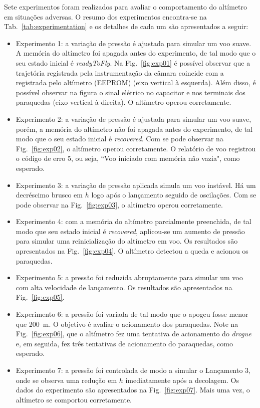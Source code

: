 \documentclass[12pt,a4paper]{article}
\begin{document}
Sete experimentos foram realizados para avaliar o comportamento do altímetro em situações adversas. O resumo dos experimentos encontra-se na Tab.~\ref{tab:experimentation} e os detalhes de cada um são apresentados a seguir:
\begin{itemize}
\item Experimento 1: a variação de pressão é ajustada para simular um voo suave. A memória do altímetro foi apagada antes do experimento, de tal modo que o seu estado inicial é \textit{readyToFly}. Na Fig.~\ref{fig:exp01} é possível observar que a trajetória registrada pela instrumentação da câmara coincide com a registrada pelo altímetro (EEPROM) (eixo vertical à esquerda). Além disso, é possível observar na figura o sinal elétrico no capacitor e nos terminais dos paraquedas (eixo vertical à direita). O altímetro operou corretamente.
\item Experimento 2: a variação de pressão é ajustada para simular um voo suave, porém, a memória do altímetro não foi apagada antes do experimento, de tal modo que o seu estado inicial é \textit{recovered}. Com se pode observar na Fig.~\ref{fig:exp02}, o altímetro operou corretamente. O relatório de voo registrou o código de erro 5, ou seja, ``Voo iniciado com memória não vazia", como esperado.
\item Experimento 3: a variação de pressão aplicada simula um voo instável. Há um decréscimo brusco em $h$ logo após o lançamento seguido de oscilações. Com se pode observar na Fig.~\ref{fig:exp03}, o altímetro operou corretamente.
\item Experimento 4: com a memória do altímetro parcialmente preenchida, de tal modo que seu estado inicial é \textit{recovered}, aplicou-se um aumento de pressão para simular uma reinicialização do altímetro em voo. Os resultados são apresentados na Fig.~\ref{fig:exp04}.  O altímetro detectou a queda e acionou os paraquedas.
\item Experimento 5: a pressão foi reduzida abruptamente para simular um voo com alta velocidade de lançamento. Os resultados são apresentados na Fig.~\ref{fig:exp05}. 
\item Experimento 6: a pressão foi variada de tal modo que o apogeu fosse menor que 200~m. O objetivo é avaliar o acionamento dos paraquedas. Note na Fig.~\ref{fig:exp06}, que o altímetro fez uma tentativa de acionamento do \textit{drogue} e, em seguida, fez três tentativas de acionamento do paraquedas, como esperado.
\item Experimento 7: a pressão foi controlada de modo a simular o Lançamento 3, onde se observa uma redução em $h$ imediatamente após a decolagem. Os dados do experimento são apresentados na Fig.~\ref{fig:exp07}. Mais uma vez, o altímetro se comportou corretamente.
\end{itemize}
\end{document}

